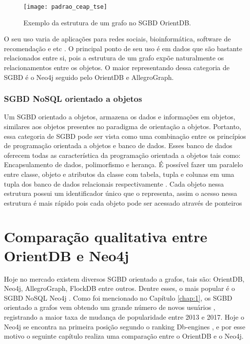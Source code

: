 \begin{figure}[h]
	\centering
    \texttt{[image: padrao\_ceap\_tse]}
    \caption{Exemplo da estrutura de um grafo no SGBD OrientDB.}
    \label{fig:graph_orientdb}
\end{figure}
	
	O seu uso varia de aplicações para redes sociais, bioinformática, software de recomendação e etc \cite{nayak2013type}. O principal ponto de seu uso é em dados que são bastante relacionados entre si, pois a estrutura de um grafo expõe naturalmente os relacionamentos entre os objetos. O maior representando dessa categoria de SGBD é o Neo4j seguido pelo OrientDB e AllegroGraph.
	
\subsubsection{SGBD NoSQL orientado a objetos}
	Um SGBD orientado a objetos, armazena os dados e informações em objetos, similares aos objetos presentes no paradigma de orientação a objetos. Portanto, essa categoria de SGBD pode ser vista como uma combinação entre os princípios de programação orientada a objetos e banco de dados. Esses banco de dados oferecem todas as característica da programação orientada a objetos tais como: Encapsulamento de dados, polimorfismo e herança. É possível fazer um paralelo entre classe, objeto e atributos da classe com tabela, tupla e colunas em uma tupla dos banco de dados relacionais respectivamente \cite{nayak2013type}. Cada objeto nessa estrutura possui um identificador único que o representa, assim o acesso nessa estrutura é mais rápido pois cada objeto pode ser acessado através de ponteiros

\section{Comparação qualitativa entre OrientDB e Neo4j} \label{comparison_graph_nosql}

	Hoje no mercado existem diversos SGBD orientado a grafos, tais são: OrientDB, Neo4j, AllegroGraph, FlockDB entre outros. Dentre esses, o mais popular é o SGBD NoSQL Neo4j \cite{neo4j-site}. Como foi mencionado no Capítulo \ref{chap:1}, os SGBD orientado a grafos vem obtendo um grande número de novos usuários \cite{Dbmspopularity}, registrando a maior taxa de mudança de popularidade entre 2013 e 2017. Hoje o Neo4j se encontra na primeira posição segundo o ranking Db-engines \cite{neo4jprimeiro}, e por esse motivo o seguinte capítulo realiza uma comparação entre o OrientDB e o Neo4j.
	
